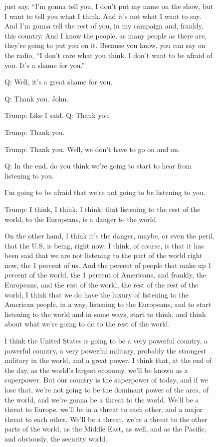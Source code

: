\begin{figure}[htbp] %
  \centering
  \begin{minipage}{\textwidth}\small
{\sffamily
just say, “I’m gonna tell you, I don’t put my name on the show, but I want to tell you what I think. And it’s not what I want to say. And I’m gonna tell the rest of you, in my campaign and, frankly, this country. And I know the people, as many people as there are, they’re going to put you on it. Because you know, you can say on the radio, “I don’t care what you think. I don’t want to be afraid of you. It’s a shame for you.”

Q: Well, it’s a great shame for you.

Q: Thank you. John.

Trump: Like I said. Q: Thank you.

Trump: Thank you.

Trump: Thank you. Well, we don’t have to go on and on.

Q: In the end, do you think we’re going to start to hear from listening to you.

I’m going to be afraid that we’re not going to be listening to you.

Trump: I think, I think, I think, that listening to the rest of the world, to the Europeans, is a danger to the world.

On the other hand, I think it’s the danger, maybe, or even the peril, that the U.S. is being, right now. I think, of course, is that it has been said that we are not listening to the part of the world right now, the 1 percent of us. And the percent of people that make up 1 percent of the world, the 1 percent of Americans, and frankly, the Europeans, and the rest of the world, the rest of the rest of the world, I think that we do have the luxury of listening to the American people, in a way, listening to the Europeans, and to start listening to the world and in some ways, start to think, and think about what we’re going to do to the rest of the world.

I think the United States is going to be a very powerful country, a powerful country, a very powerful military, probably the strongest military in the world, and a great power. I think that, at the end of the day, as the world’s largest economy, we’ll be known as a superpower. But our country is the superpower of today, and if we lose that, we’re not going to be the dominant power of the area, of the world, and we’re gonna be a threat to the world. We’ll be a threat to Europe, we’ll be in a threat to each other, and a major threat to each other. We’ll be a threat, we’re a threat to the other parts of the world, as the Middle East, as well, and as the Pacific, and obviously, the security world.

}
\end{minipage}
\end{figure}
